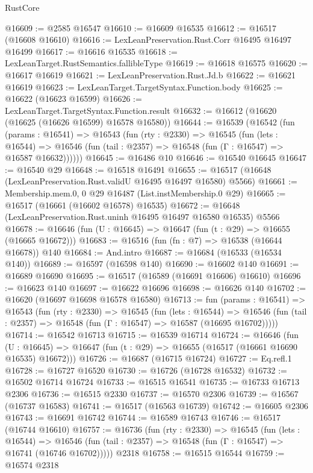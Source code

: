 \begin{lexlean}{RustCore}
\begin{coremodule}
@16609 := @2585 @16547
@16610 := @16609 @16535
@16612 := @16517 (@16608 @16610)
@16616 := LexLeanPreservation.Rust.Corr @16495 @16497 @16499
@16617 := @16616 @16535
@16618 := LexLeanTarget.RustSemantics.fallibleType
@16619 := @16618 @16575
@16620 := @16617 @16619
@16621 := LexLeanPreservation.Rust.Jd.b
@16622 := @16621 @16619
@16623 := LexLeanTarget.TargetSyntax.Function.body
@16625 := @16622 (@16623 @16599)
@16626 := LexLeanTarget.TargetSyntax.Function.result
@16632 := @16612 (@16620 (@16625 (@16626 @16599) @16578 @16580))
@16644 := @16539
    (@16542
      (fun (params : @16541) =>
      @16543
        (fun (rty : @2330) =>
        @16545
          (fun (lets : @16544) =>
          @16546 (fun (tail : @2357) => @16548 (fun (Γ : @16547) => @16587 @16632))))))
@16645 := @16486 @10
@16646 := @16540 @16645
@16647 := @16540 @29
@16648 := @16518 @16491
@16655 := @16517 (@16648 (LexLeanPreservation.Rust.validU @16495 @16497 @16580) @5566)
@16661 := Membership.mem.{0, 0} @29 @16487 (List.instMembership.{0} @29)
@16665 := @16517 (@16661 (@16602 @16578) @16535)
@16672 := @16648 (LexLeanPreservation.Rust.uninh @16495 @16497 @16580 @16535) @5566
@16678 := @16646 (fun (U : @16645) => @16647 (fun (t : @29) => @16655 (@16665 @16672)))
@16683 := @16516 (fun (fn : @7) => @16538 (@16644 @16678)) @140
@16684 := And.intro
@16687 := @16684 (@16533 (@16534 @140))
@16689 := @16597 (@16598 @140)
@16690 := @16602 @140
@16691 := @16689 @16690
@16695 := @16517 (@16589 (@16691 @16606) @16610)
@16696 := @16623 @140
@16697 := @16622 @16696
@16698 := @16626 @140
@16702 := @16620 (@16697 @16698 @16578 @16580)
@16713 := fun (params : @16541) =>
  @16543
    (fun (rty : @2330) =>
    @16545
      (fun (lets : @16544) =>
      @16546 (fun (tail : @2357) => @16548 (fun (Γ : @16547) => @16587 (@16695 @16702)))))
@16714 := @16542 @16713
@16715 := @16539 @16714
@16724 := @16646
    (fun (U : @16645) => @16647 (fun (t : @29) => @16655 (@16517 (@16661 @16690 @16535) @16672)))
@16726 := @16687 (@16715 @16724)
@16727 := Eq.refl.{1}
@16728 := @16727 @16520
@16730 := @16726 (@16728 @16532)
@16732 := @16502 @16714 @16724
@16733 := @16515 @16541
@16735 := @16733 @16713 @2306
@16736 := @16515 @2330
@16737 := @16570 @2306
@16739 := @16567 (@16737 @16583)
@16741 := @16517 (@16563 @16739)
@16742 := @16605 @2306
@16743 := @16691 @16742
@16744 := @16589 @16743
@16746 := @16517 (@16744 @16610)
@16757 := @16736
    (fun (rty : @2330) =>
    @16545
      (fun (lets : @16544) =>
      @16546 (fun (tail : @2357) => @16548 (fun (Γ : @16547) => @16741 (@16746 @16702)))))
    @2318
@16758 := @16515 @16544
@16759 := @16574 @2318

\end{coremodule}
\end{lexlean}
